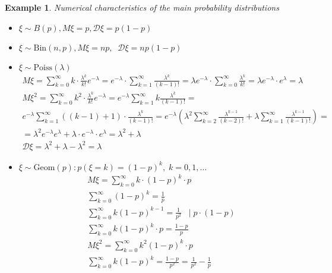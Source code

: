 \documentclass[12pt,letterpaper]{report}
\newtheorem*{example}{Example}
\begin{document}
\begin{example}
    Numerical characteristics of the main probability distributions
    \begin{itemize}
        \item[1.] $ \xi \sim B(p), M\xi = p, \mathcal{D}\xi = p(1-p) $ 
        \item[2.] $ \xi \sim \text{Bin}(n,p), M\xi = np, \;\; \mathcal{D}\xi = np(1-p)$
        \item[3.] $\xi \sim \text{Poiss}(\lambda)$
            \begin{gather*}
                M\xi = \sum_{k=0}^{\infty} k\cdot \frac{\lambda^k}{k!} e^{-\lambda} =
                e^{-\lambda} \cdot \sum_{k=1}^{\infty}\frac{\lambda^k}{(k-1)!} = 
                \lambda e^{-\lambda} \cdot \sum_{k=0}^{\infty} \frac{\lambda^k}{k!} =
                \lambda e^{-\lambda} \cdot e^{\lambda} =
                \lambda \\
                M\xi^2 = \sum_{k=0}^{\infty} k^2 \cdot \frac{\lambda^k}{k!} e^{-\lambda} =
                e^{-\lambda} \sum_{k=1}^{\infty}k\frac{\lambda ^{k}}{(k-1)!} = \\
                e^{-\lambda} \sum_{k=1}^{\infty}((k-1)+1) \cdot \frac{\lambda^k}{(k-1)!} =
                e^{-\lambda} (\lambda^2 \sum_{k=2}^{\infty}\frac{\lambda^{k-1}}{(k-2)!} +
                    \lambda \sum_{k=1}^{\infty} \frac{\lambda^{k-1}}{(k-1)!}) =\\
                = \lambda^2 e^{-\lambda} e^{\lambda} + \lambda \cdot e^{-\lambda} \cdot e^{\lambda} =
                \lambda^2 + \lambda \\
                \mathcal{D}\xi = \lambda^2 + \lambda - \lambda^2 = \lambda
            \end{gather*}
        \item[4.] $\xi \sim \text{Geom}(p): p(\xi = k) = (1-p)^{k}, \; k=0,1,\dots$
            \begin{gather*}
                M\xi = \sum_{k=0}^{\infty} k\cdot (1-p)^{k} \cdot p \\
                \sum_{k=0}^{\infty}(1-p)^{k} = \frac{1}{p} \\
                \sum_{k=0}^{\infty} k (1-p)^{k-1} = \frac{1}{p^2} \;\; \mid p\cdot (1-p) \\
                \sum_{k=0}^{\infty} k(1-p)^{k}\cdot p = \frac{1-p}{p}\\
                M\xi^2 = \sum_{k=0}^{\infty} k^2 (1-p)^{k}\cdot p \\
                \sum_{k=0}^{\infty} k(1-p)^{k} = \frac{1-p}{p^2}=\frac{1}{p^2} - \frac{1}{p} \\

\end{gather*}
\end{itemize}
\end{example}
\end{document}
